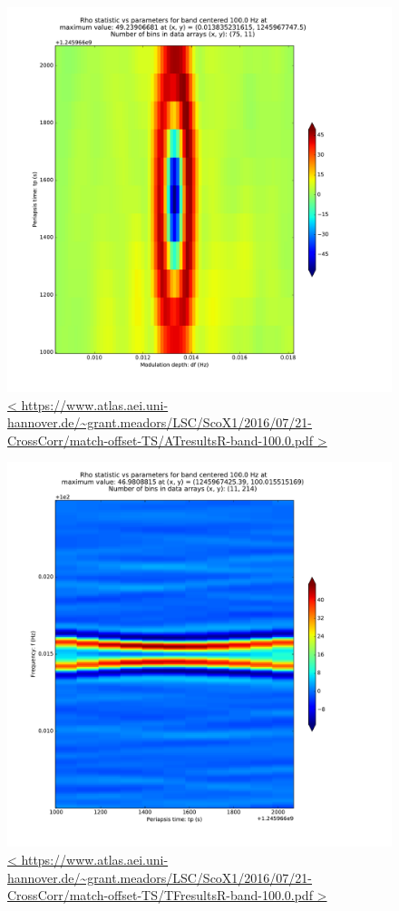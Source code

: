 \documentclass{article}
\begin{document}
\begin{figure}
\includegraphics[trim= 0 0 0 0, clip, width=0.40\paperwidth,keepaspectratio]{plots/match-offset-TS/ATresultsR-band-100-0.pdf}
\caption{
\url{<
https://www.atlas.aei.uni-hannover.de/~grant.meadors/LSC/ScoX1/2016/07/21-CrossCorr/match-offset-TS/ATresultsR-band-100.0.pdf
>}
}
\end{figure}

\begin{figure}
\includegraphics[trim= 0 0 0 0, clip, width=0.40\paperwidth,keepaspectratio]{plots/match-offset-TS/TFresultsR-band-100-0.pdf}
\caption{
\url{<
https://www.atlas.aei.uni-hannover.de/~grant.meadors/LSC/ScoX1/2016/07/21-CrossCorr/match-offset-TS/TFresultsR-band-100.0.pdf
>}
}
\end{figure}
\end{document}
